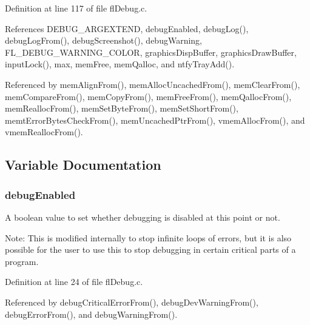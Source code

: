 Definition at line 117 of file fl\-Debug.c.

References DEBUG\_\-ARGEXTEND, debug\-Enabled, debug\-Log(), debug\-Log\-From(), debug\-Screenshot(), debug\-Warning, FL\_\-DEBUG\_\-WARNING\_\-COLOR, graphics\-Disp\-Buffer, graphics\-Draw\-Buffer, input\-Lock(), max, mem\-Free, mem\-Qalloc, and ntfy\-Tray\-Add().

Referenced by mem\-Align\-From(), mem\-Alloc\-Uncached\-From(), mem\-Clear\-From(), mem\-Compare\-From(), mem\-Copy\-From(), mem\-Free\-From(), mem\-Qalloc\-From(), mem\-Realloc\-From(), mem\-Set\-Byte\-From(), mem\-Set\-Short\-From(), memt\-Error\-Bytes\-Check\-From(), mem\-Uncached\-Ptr\-From(), vmem\-Alloc\-From(), and vmem\-Realloc\-From().

\subsection{Variable Documentation}
\subsubsection{ {\bf debug\-Enabled}}\label{flDebug_8h_d0344eb1bc475981a837e350c08fb53a}


A boolean value to set whether debugging is disabled at this point or not. 

\begin{Desc}
\item[Note:]This is modified internally to stop infinite loops of errors, but it is also possible for the user to use this to stop debugging in certain critical parts of a program. \end{Desc}


Definition at line 24 of file fl\-Debug.c.

Referenced by debug\-Critical\-Error\-From(), debug\-Dev\-Warning\-From(), debug\-Error\-From(), and debug\-Warning\-From().